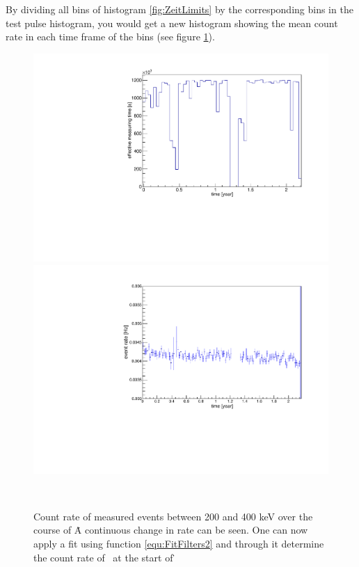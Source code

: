 \documentclass[encoding=utf8,british]{tumphthesis}
\begin{document}
By dividing all bins of histogram \ref{fig:ZeitLimits} by the corresponding bins in the test pulse histogram, you would get a new histogram showing the mean count rate in each time frame of the bins (see figure \ref{fig:ChangeInEventRate}).
\\
\begin{figure}[t!]
	\centering
	\begin{minipage}{.5\textwidth}
		\centering
		\includegraphics[width=\textwidth]{./Bilder/testpuler.pdf}
		\caption{
			Histogram showing the mean measuring time of each week corresponding to the individual bins.
			Those were determined by the amount of test pulse signals measured in the time frames and their amount multiplied by 20s.
			From the course of this histogram one can see, that the measuring time of each week varied on a broad level.
			}
		\label{fig:effectiveMeasuringTimes}
	\end{minipage}\hfill%
	\begin{minipage}{.5\textwidth}
		\centering
		\includegraphics[width=\textwidth]{./Bilder/eventRate.pdf}
		\caption{
			Count rate of measured events between 200 and 400 keV over the course of \PII\.
			A continuous change in rate can be seen. 
			One can now apply a fit using function \ref{equ:FitFilters2} and through it determine the count rate of \Kr\ at the start of \PII\.
			}
		\label{fig:ChangeInEventRate}
	\end{minipage}
	\\
\end{figure}
\end{document}
